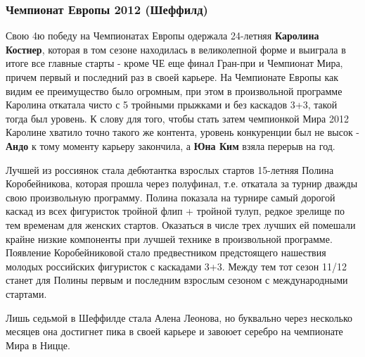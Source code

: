  
 
 
 
 

\subsubsection{Чемпионат Европы 2012 (Шеффилд)}
\label{sec:04_01_2022.yz.figurka_ot_maksima_jagudina.1.chempionaty_evropy.2.sheffild_2012}

Свою 4ю победу на Чемпионатах Европы одержала 24-летняя \textbf{Каролина Костнер},
которая в том сезоне находилась в великолепной форме и выиграла в итоге все
главные старты - кроме ЧЕ еще финал Гран-при и Чемпионат Мира, причем первый и
последний раз в своей карьере. На Чемпионате Европы как видим ее преимущество
было огромным, при этом в произвольной программе Каролина откатала чисто с 5
тройными прыжками и без каскадов 3+3, такой тогда был уровень. К слову для
того, чтобы стать затем чемпионкой Мира 2012 Каролине хватило точно такого же
контента, уровень конкуренции был не высок - \textbf{Андо} к тому моменту карьеру
закончила, а \textbf{Юна Ким} взяла перерыв на год.


Лучшей из россиянок стала дебютантка взрослых стартов 15-летняя Полина
Коробейникова, которая прошла через полуфинал, т.е. откатала за турнир дважды
свою произвольную программу. Полина показала на турнире самый дорогой каскад из
всех фигуристок тройной флип + тройной тулуп, редкое зрелище по тем временам
для женских стартов. Оказаться в числе трех лучших ей помешали крайне низкие
компоненты при лучшей технике в произвольной программе. Появление
Коробейниковой стало предвестником предстоящего нашествия молодых российских
фигуристок с каскадами 3+3. Между тем тот сезон 11/12 станет для Полины первым
и последним взрослым сезоном с международными стартами.


Лишь седьмой в Шеффилде стала Алена Леонова, но буквально через несколько
месяцев она достигнет пика в своей карьере и завоюет серебро на чемпионате Мира
в Ницце.
